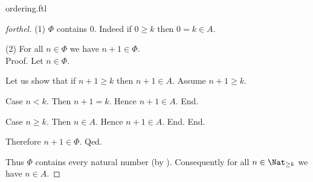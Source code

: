 \documentclass{naproche-library}
\begin{document}
\begin{smodule}{ordering.ftl}
\begin{proof}[forthel]
    (1) $\Phi$ contains $0$.
    Indeed if $0 \geq k$ then $0 = k \in A$.

    (2) For all $n \in \Phi$ we have $n + 1 \in \Phi$. \\
    Proof.
      Let $n \in \Phi$.

      Let us show that if $n + 1 \geq k$ then $n + 1 \in A$.
        Assume $n + 1 \geq k$.

        Case $n < k$.
          Then $n + 1 = k$.
          Hence $n + 1 \in A$.
        End.

        Case $n \geq k$.
          Then $n \in A$.
          Hence $n + 1 \in A$.
        End.
      End.

      Therefore $n + 1 \in \Phi$.
    Qed.

    Thus $\Phi$ contains every natural number (by ).
    Consequently for all $n \in \Nat_{\geq k}$ we have $n \in A$.
  \end{proof}
\end{smodule}
\end{document}
